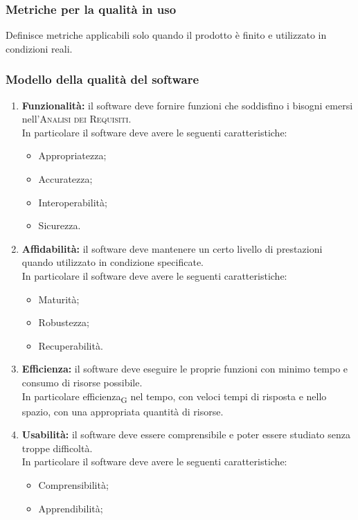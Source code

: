 \subsubsection{Metriche per la qualità in uso}
Definisce metriche applicabili solo quando il prodotto è finito e utilizzato in condizioni reali.
\subsubsection{Modello della qualità del software}
\begin{enumerate}
	\item \textbf{Funzionalità:} il software deve fornire funzioni che soddisfino i bisogni emersi nell'\textsc{Analisi dei Requisiti}.\\In particolare il software deve avere le seguenti caratteristiche:
		\begin{itemize}
			\item Appropriatezza;
			\item Accuratezza;
			\item Interoperabilità;
			\item Sicurezza.
		\end{itemize} 
	\item \textbf{Affidabilità:} il software deve mantenere un certo livello di prestazioni quando utilizzato in condizione specificate.\\In particolare il software deve avere le seguenti caratteristiche:
		\begin{itemize}
			\item Maturità;
			\item Robustezza;
			\item Recuperabilità.
		\end{itemize}
	\item \textbf{Efficienza:} il software deve eseguire le proprie funzioni con minimo tempo e consumo di risorse possibile.\\In particolare efficienza\textsubscript{G} nel tempo, con veloci tempi di risposta e nello spazio, con una appropriata quantità di risorse.
	\item \textbf{Usabilità:} il software deve essere comprensibile e poter essere studiato senza troppe difficoltà.\\In particolare il software deve avere le seguenti caratteristiche:
		\begin{itemize}
			\item Comprensibilità;
			\item Apprendibilità;

\end{itemize}
\end{enumerate}
